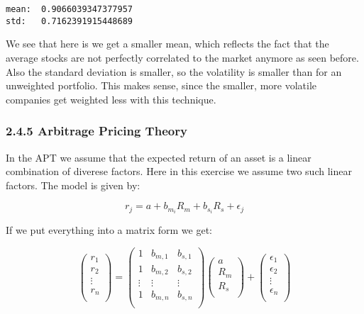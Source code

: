 \documentclass[11pt]{article}
\begin{document}
    \begin{Verbatim}[commandchars=\\\{\}]
mean:  0.9066039347377957
std:   0.7162391915448689
    \end{Verbatim}

    We see that here is we get a smaller mean, which reflects the fact that
the average stocks are not perfectly correlated to the market anymore as
seen before. Also the standard deviation is smaller, so the volatility
is smaller than for an unweighted portfolio. This makes sense, since the
smaller, more volatile companies get weighted less with this technique.

    \hypertarget{arbitrage-pricing-theory}{%
\subsubsection{2.4.5 Arbitrage Pricing
Theory}\label{arbitrage-pricing-theory}}

    In the APT we assume that the expected return of an asset is a linear
combination of diverese factors. Here in this exercise we assume two
such linear factors. The model is given by:

\[ r_j = a + b_{m_i}R_m + b_{s_i}R_s + \epsilon_j \]

If we put everything into a matrix form we get:

\begin{equation}
    \begin{pmatrix}
        r_{1} \\
        r_{2} \\
        \vdots \\
        r_{n} \\
    \end{pmatrix}
    =
    \begin{pmatrix}
        1 & b_{m,1} & b_{s,1} \\
        1 & b_{m,2} & b_{s,2} \\
        \vdots & \vdots & \vdots \\
        1 & b_{m,n} & b_{s,n}\\
    \end{pmatrix}
    \begin{pmatrix}
        a \\
        R_m \\
        R_s\\
    \end{pmatrix}
    +
    \begin{pmatrix}
        \epsilon_1 \\
        \epsilon_2 \\
        \vdots \\
        \epsilon_n \\
    \end{pmatrix}
\end{equation}
\end{document}

